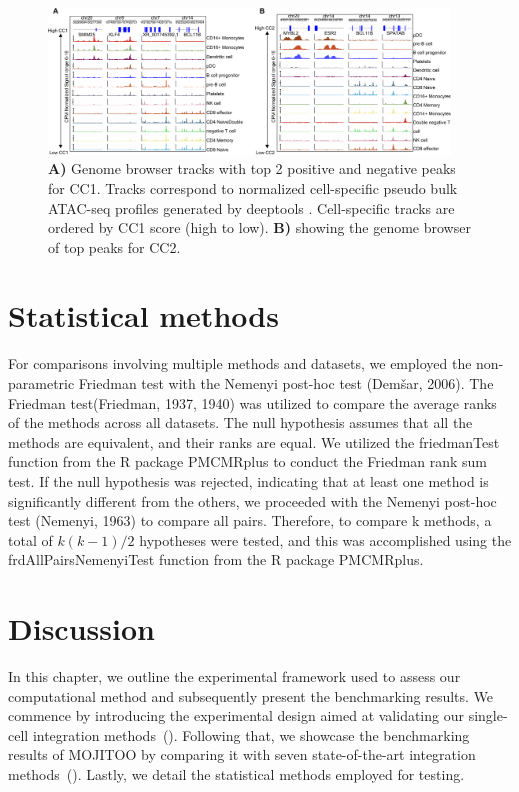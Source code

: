 \begin{figure}[!h]
	\centering
	\includegraphics[width=0.95\textwidth]{CC_Peaks/fig}
	\vspace{0.1cm}
	\caption[Genome browser tracks of top 2 positive and negative peaks for CC1 and CC2.]{\textbf{A)} Genome browser tracks with top 2 positive and negative peaks for CC1. Tracks correspond to normalized cell-specific pseudo bulk ATAC-seq profiles generated by deeptools \citep{ramirez2016deeptools2}. Cell-specific tracks are ordered by CC1 score (high to low). \textbf{B)} showing the genome browser of top peaks for CC2.}
	\label{fig:CC_Peaks}
\end{figure}

\section{Statistical methods}
\label{MOJITOO:statistical}
For comparisons involving multiple methods and datasets, we employed the non-parametric Friedman test with the Nemenyi post-hoc test (Demšar, 2006). The Friedman test(Friedman, 1937, 1940) was utilized to compare the average ranks of the methods across all datasets. The null hypothesis assumes that all the methods are equivalent, and their ranks are equal. We utilized the friedmanTest function from the R package PMCMRplus to conduct the Friedman rank sum test. If the null hypothesis was rejected, indicating that at least one method is significantly different from the others, we proceeded with the Nemenyi post-hoc test (Nemenyi, 1963) to compare all pairs. Therefore, to compare k methods, a total of $k(k-1)/2$ hypotheses were tested, and this was accomplished using the frdAllPairsNemenyiTest function from the R package PMCMRplus.

\section{Discussion}
\label{MOJITOO:discussion}
In this chapter, we outline the experimental framework used to assess our computational method and subsequently present the benchmarking results. We commence by introducing the experimental design aimed at validating our single-cell integration methods~(). Following that, we showcase the benchmarking results of MOJITOO by comparing it with seven state-of-the-art integration methods~(). Lastly, we detail the statistical methods employed for testing.

